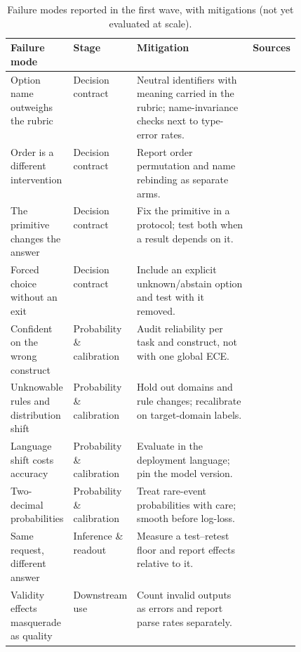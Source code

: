 \begin{table}[tbp]
\centering\footnotesize
\caption{Failure modes reported in the first wave, with mitigations (not yet evaluated at scale).}\label{tab:failures}
\begin{tabularx}{\linewidth}{p{0.2\linewidth}p{0.12\linewidth}Xp{0.16\linewidth}}
\toprule
\textbf{Failure mode} & \textbf{Stage} & \textbf{Mitigation} & \textbf{Sources} \\
\midrule
Option name outweighs the rubric & Decision contract & Neutral identifiers with meaning carried in the rubric; name-invariance checks next to type-error rates. & \citep{arxiv2609_26758} \\
Order is a different intervention & Decision contract & Report order permutation and name rebinding as separate arms. & \citep{gh_jujumilk3_jev_calibration_audit,gh_nokia_applied_research_anyjev} \\
The primitive changes the answer & Decision contract & Fix the primitive in a protocol; test both when a result depends on it. & \citep{gh_jujumilk3_jev_calibration_audit,gh_jjd_lab_jev_synthetic_survey} \\
Forced choice without an exit & Decision contract & Include an explicit unknown/abstain option and test with it removed. & \citep{gh_jujumilk3_jev_calibration_audit} \\
Confident on the wrong construct & Probability \& calibration & Audit reliability per task and construct, not with one global ECE. & \citep{arxiv2609_24574,gh_jourdanlabs_assay_001} \\
Unknowable rules and distribution shift & Probability \& calibration & Hold out domains and rule changes; recalibrate on target-domain labels. & \citep{gh_scienthoon_jev_ood_calibration} \\
Language shift costs accuracy & Probability \& calibration & Evaluate in the deployment language; pin the model version. & \citep{gh_marcosmartinez_jev_acento,typesafe2026models} \\
Two-decimal probabilities & Probability \& calibration & Treat rare-event probabilities with care; smooth before log-loss. & \citep{arxiv2609_24052,gh_scienthoon_jev_ood_calibration} \\
Same request, different answer & Inference \& readout & Measure a test–retest floor and report effects relative to it. & \citep{arxiv2609_26758,gh_jujumilk3_jev_calibration_audit,arxiv2609_27678} \\
Validity effects masquerade as quality & Downstream use & Count invalid outputs as errors and report parse rates separately. & \citep{arxiv2609_26550} \\

\end{tabularx}
\end{table}
